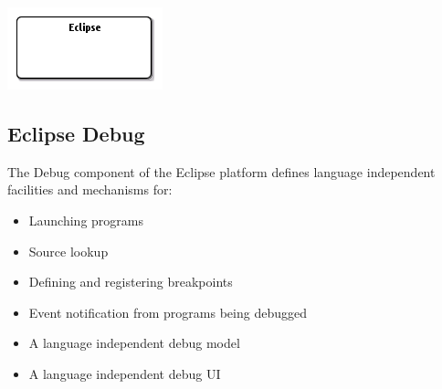 \documentclass{gemoc} %
\begin{document}
\begin{center}
\includegraphics*[trim=0.0cm 0.0cm 0cm 0.0cm, clip=true]{../images/generated/Generated_Eclipse.png}
\end{center}




\subsection{Eclipse Debug}
\label{sec:Eclipse_Debug}

The Debug component of the Eclipse platform defines language independent facilities and mechanisms for:
\begin{itemize}
\item Launching programs
\item Source lookup
\item Defining and registering breakpoints
\item Event notification from programs being debugged
\item A language independent debug model
\item A language independent debug UI
\end{itemize}
\end{document}
